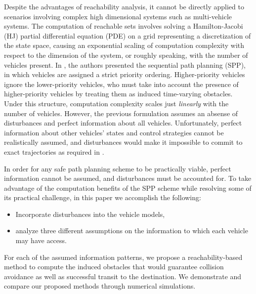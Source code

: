 Despite the advantages of reachability analysis, it cannot be directly applied to scenarios involving complex high dimensional systems such as multi-vehicle systems. The computation of reachable sets involves solving a Hamilton-Jacobi (HJ) partial differential equation (PDE) on a grid representing a discretization of the state space, causing an exponential scaling of computation complexity with respect to the dimension of the system, or roughly speaking, with the number of vehicles present. In \cite{Chen15}, the authors presented the sequential path planning (SPP), in which vehicles are assigned a strict priority ordering.  Higher-priority vehicles ignore the lower-priority vehicles, who must take into account the presence of higher-priority vehicles by treating them as induced time-varying obstacles. Under this structure, computation complexity scales just \textit{linearly} with the number of vehicles. However, the previous formulation assumes an absense of disturbances and perfect information about all vehicles. Unfortunately, perfect information about other vehicles' states and control strategies cannot be realistically assumed, and disturbances would make it impossible to commit to exact trajectories as required in \cite{Chen15}.

In order for any safe path planning scheme to be practically viable, perfect information cannot be assumed, and disturbances must be accounted for. To take advantage of the computation benefits of the SPP scheme while resolving some of its practical challenge, in this paper we accomplish the following:

\begin{itemize}
\item Incorporate disturbances into the vehicle models,
\item analyze three different assumptions on the information to which each vehicle may have access.
\end{itemize}

For each of the assumed information patterns, we propose a reachability-based method to compute the induced obstacles that would guarantee collision avoidance as well as successful transit to the destination. We demonstrate and compare our proposed methods through numerical simulations.
